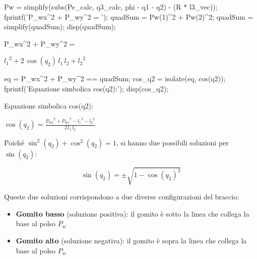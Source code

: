 \documentclass[11pt, a4paper]{article}
\begin{document}
\begin{matlabcode}
Pw = simplify(subs(Pe_calc, q3_calc, phi - q1 - q2) - (R * l3_vec));
fprintf('P_{wx}^2 + P_{wy}^2 = \n');
quadSum = Pw(1)^2 + Pw(2)^2;
quadSum = simplify(quadSum);
disp(quadSum);
\end{matlabcode}
\begin{matlaboutput}
P_{wx}^2 + P_{wy}^2 =
\end{matlaboutput}
\begin{matlabsymbolicoutput}
$\displaystyle {l_1 }^2 +2\,\cos \left(q_2 \right)\,l_1 \,l_2 +{l_2 }^2 $
\end{matlabsymbolicoutput}

\begin{matlabcode}

eq = P_wx^2 + P_wy^2 == quadSum;
cos_q2 = isolate(eq, cos(q2));
fprintf('Equazione simbolica cos(q2):\n');
disp(cos_q2);
\end{matlabcode}
\begin{matlaboutput}
Equazione simbolica cos(q2):
\end{matlaboutput}
\begin{matlabsymbolicoutput}
$\displaystyle \cos \left(q_2 \right)=\frac{{P_{\textrm{wx}} }^2 +{P_{\textrm{wy}} }^2 -{l_1 }^2 -{l_2 }^2 }{2\,l_1 \,l_2 }$
\end{matlabsymbolicoutput}
\begin{matlabcode}

\end{matlabcode}

\begin{par}
\begin{flushleft}
Poiché $\sin^2 (q_2 )+\cos^2 (q_2 )=1$, si hanno due possibili soluzioni per $\sin (q_2 )$:
\end{flushleft}
\end{par}

\[
    \sin(q_2) = \pm \sqrt{1 - \cos(q_2)^2}
\]

\begin{par}
\begin{flushleft}
Queste due soluzioni corrispondono a due diverse configurazioni del braccio:
\end{flushleft}
\end{par}

\begin{itemize}
\setlength{\itemsep}{-1ex}
   \item{\begin{flushleft} \textbf{Gomito basso} (soluzione positiva): il gomito è sotto la linea che collega la base al polso $P_w$ \end{flushleft}}
   \item{\begin{flushleft} \textbf{Gomito alto} (soluzione negativa): il gomito è sopra la linea che collega la base al polso $P_w$ \end{flushleft}}
\end{itemize}
\end{document}
